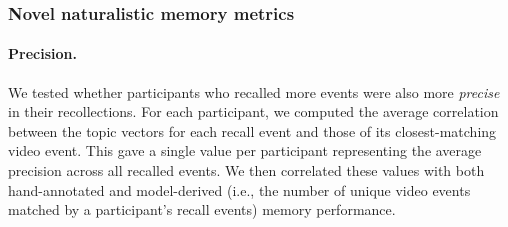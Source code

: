 \documentclass{article}
\begin{document}


\subsubsection*{Novel naturalistic memory metrics}

\paragraph*{Precision.}
We tested whether participants who recalled more events were also more \textit{precise} in their recollections. For each participant, we computed the average correlation between the topic vectors for each recall event and those of its closest-matching video event. This gave a single value per participant representing the average precision across all recalled events.  We then correlated these values with both hand-annotated and model-derived (i.e., the number of unique video events matched by a participant's recall events) memory performance.
\end{document}
